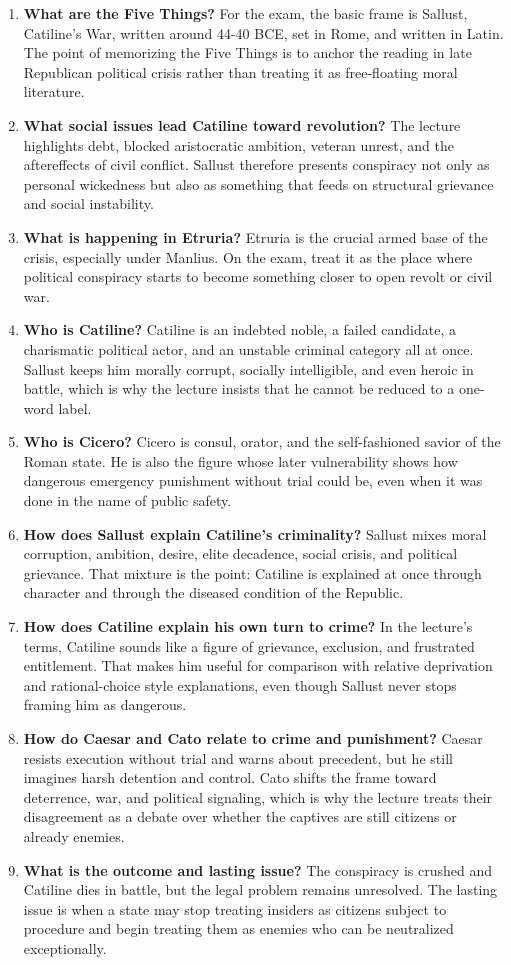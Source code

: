 \documentclass[11pt]{article}
\begin{document}
\begin{enumerate}
\item \textbf{What are the Five Things?} For the exam, the basic frame is Sallust, Catiline's War, written around 44-40 BCE, set in Rome, and written in Latin. The point of memorizing the Five Things is to anchor the reading in late Republican political crisis rather than treating it as free-floating moral literature.
\item \textbf{What social issues lead Catiline toward revolution?} The lecture highlights debt, blocked aristocratic ambition, veteran unrest, and the aftereffects of civil conflict. Sallust therefore presents conspiracy not only as personal wickedness but also as something that feeds on structural grievance and social instability.
\item \textbf{What is happening in Etruria?} Etruria is the crucial armed base of the crisis, especially under Manlius. On the exam, treat it as the place where political conspiracy starts to become something closer to open revolt or civil war.
\item \textbf{Who is Catiline?} Catiline is an indebted noble, a failed candidate, a charismatic political actor, and an unstable criminal category all at once. Sallust keeps him morally corrupt, socially intelligible, and even heroic in battle, which is why the lecture insists that he cannot be reduced to a one-word label.
\item \textbf{Who is Cicero?} Cicero is consul, orator, and the self-fashioned savior of the Roman state. He is also the figure whose later vulnerability shows how dangerous emergency punishment without trial could be, even when it was done in the name of public safety.
\item \textbf{How does Sallust explain Catiline's criminality?} Sallust mixes moral corruption, ambition, desire, elite decadence, social crisis, and political grievance. That mixture is the point: Catiline is explained at once through character and through the diseased condition of the Republic.
\item \textbf{How does Catiline explain his own turn to crime?} In the lecture's terms, Catiline sounds like a figure of grievance, exclusion, and frustrated entitlement. That makes him useful for comparison with relative deprivation and rational-choice style explanations, even though Sallust never stops framing him as dangerous.
\item \textbf{How do Caesar and Cato relate to crime and punishment?} Caesar resists execution without trial and warns about precedent, but he still imagines harsh detention and control. Cato shifts the frame toward deterrence, war, and political signaling, which is why the lecture treats their disagreement as a debate over whether the captives are still citizens or already enemies.
\item \textbf{What is the outcome and lasting issue?} The conspiracy is crushed and Catiline dies in battle, but the legal problem remains unresolved. The lasting issue is when a state may stop treating insiders as citizens subject to procedure and begin treating them as enemies who can be neutralized exceptionally.
\end{enumerate}
\end{document}
